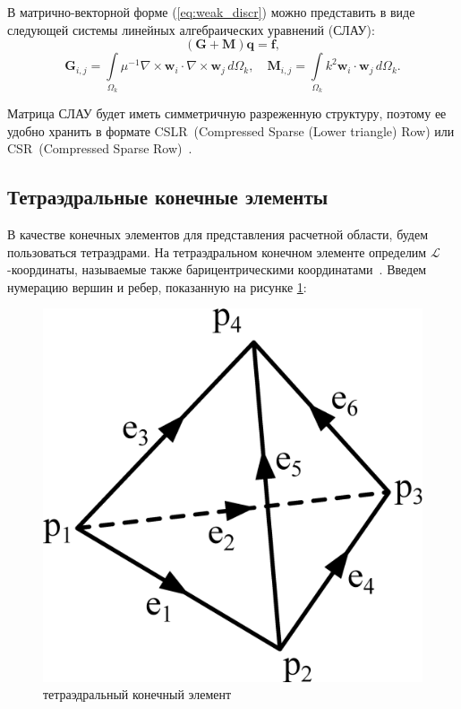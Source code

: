 \documentclass[a4paper,12pt]{article}
\begin{document}
В матрично-векторной форме (\ref{eq:weak_discr}) можно представить в виде следующей системы линейных алгебраических уравнений (СЛАУ):
\begin{equation}
	( \mathbf{G} + \mathbf{M} )\mathbf{q} = \mathbf{f} , \label{eq:form_29}
\end{equation}
\begin{equation*}
	\mathbf{G}_{ i,j } = \int\limits_{\Omega_k} \mu^{-1} \nabla \times \mathbf{w}_i \cdot \nabla \times \mathbf{w}_j \,d\Omega_k , \text{~~~}
	\mathbf{M}_{ i,j } = \int\limits_{\Omega_k} k^2 \mathbf{w}_i \cdot \mathbf{w}_j \,d\Omega_k . \label{eq:local_matrixes}
\end{equation*}

Матрица СЛАУ будет иметь симметричную разреженную структуру, поэтому ее удобно хранить в формате CSLR~(Compressed Sparse (Lower triangle) Row) или CSR~(Compressed Sparse Row)~\citep{balandin_slae}.


\subsection{Тетраэдральные конечные элементы}

В качестве конечных элементов для представления расчетной области, будем пользоваться тетраэдрами. На тетраэдральном конечном элементе определим $\mathcal{L}$-ко\-ор\-ди\-на\-ты, называемые также барицентрическими координатами~\citep{soloveychick}. Введем нумерацию вершин и ребер, показанную на рисунке \ref{fig:theory:tetrahedron}:
\begin{figure}[H]
	\centering
	\includegraphics[scale=0.25]{theory/tetrahedron.eps}
	\caption{тетраэдральный конечный элемент}
	\label{fig:theory:tetrahedron}
\end{figure}
\end{document}
